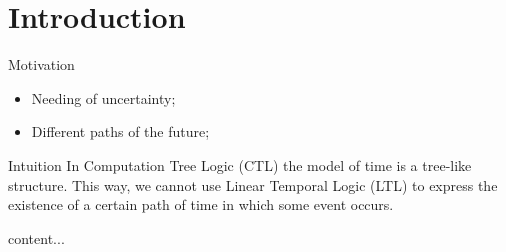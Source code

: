 \section{Introduction}
\begin{frame}{Motivation}
	\begin{itemize}
		\item 
		{
			Needing of uncertainty;
			\pause
		} 
		\item 
		{
			Different paths of the future;
		}
	\end{itemize}
\end{frame}
\begin{frame}{Intuition}
	In Computation Tree Logic (CTL) the model of time is a tree-like structure. This way, we cannot use Linear Temporal Logic (LTL) to express the existence of a certain path of time in which some event occurs.
\end{frame}

\begin{frame}
    content...
\end{frame}
